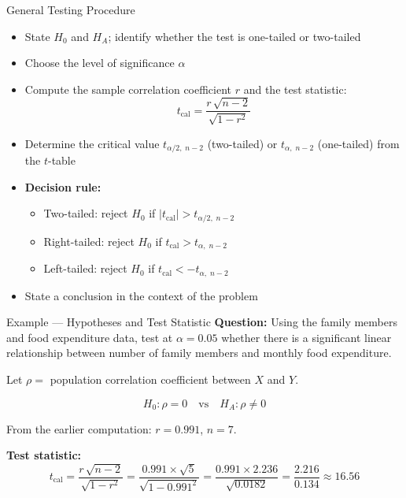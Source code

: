 \documentclass[12pt, aspectratio=169]{beamer}
\begin{document}
    \begin{frame}{General Testing Procedure}
        \begin{itemize}
            \item State $H_0$ and $H_A$; identify whether the test is one-tailed
                or two-tailed
            \item Choose the level of significance $\alpha$
            \item Compute the sample correlation coefficient $r$ and the test
                statistic:
            \[
                t_{\text{cal}} = \frac{r\,\sqrt{n-2}}{\sqrt{1-r^2}}
            \]
            \item Determine the critical value $t_{\alpha/2,\;n-2}$ (two-tailed)
                or $t_{\alpha,\;n-2}$ (one-tailed) from the $t$-table
            \item \textbf{Decision rule:}
            \begin{itemize}
                \item Two-tailed: reject $H_0$ if
                    $|t_{\text{cal}}| > t_{\alpha/2,\;n-2}$
                \item Right-tailed: reject $H_0$ if
                    $t_{\text{cal}} > t_{\alpha,\;n-2}$
                \item Left-tailed: reject $H_0$ if
                    $t_{\text{cal}} < -t_{\alpha,\;n-2}$
            \end{itemize}
            \item State a conclusion in the context of the problem
        \end{itemize}
    \end{frame}


    \begin{frame}{Example --- Hypotheses and Test Statistic}
        \textbf{Question:} Using the family members and food expenditure data,
        test at $\alpha = 0.05$ whether there is a significant linear relationship
        between number of family members and monthly food expenditure.

        \vspace{0.8em}

        Let $\rho =$ population correlation coefficient between $X$ and $Y$.

        \[
            H_0: \rho = 0 \quad \text{vs} \quad H_A: \rho \neq 0
        \]

        \vspace{0.5em}

        From the earlier computation: $r = 0.991$, $n = 7$.

        \vspace{0.3em}

        \textbf{Test statistic:}
        \[
            t_{\text{cal}}
            = \frac{r\,\sqrt{n-2}}{\sqrt{1-r^2}}
            = \frac{0.991 \times \sqrt{5}}{\sqrt{1 - 0.991^2}}
            = \frac{0.991 \times 2.236}{\sqrt{0.0182}}
            = \frac{2.216}{0.134}
            \approx 16.56
        \]
    \end{frame}
\end{document}
